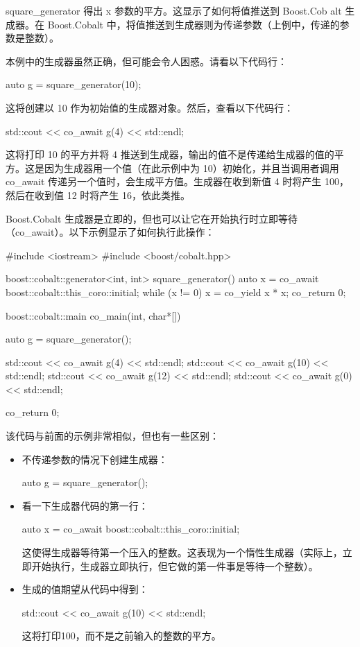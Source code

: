 square\_generator 得出 x 参数的平方。这显示了如何将值推送到 Boost.Cob alt 生成器。在 Boost.Cobalt 中，将值推送到生成器则为传递参数（上例中，传递的参数是整数）。

本例中的生成器虽然正确，但可能会令人困惑。请看以下代码行：

\begin{cpp}
auto g = square_generator(10);
\end{cpp}

这将创建以 10 作为初始值的生成器对象。然后，查看以下代码行：

\begin{cpp}
std::cout << co_await g(4) << std::endl;
\end{cpp}

这将打印 10 的平方并将 4 推送到生成器，输出的值不是传递给生成器的值的平方。这是因为生成器用一个值（在此示例中为 10）初始化，并且当调用者调用 co\_await 传递另一个值时，会生成平方值。生成器在收到新值 4 时将产生 100，然后在收到值 12 时将产生 16，依此类推。

Boost.Cobalt 生成器是立即的，但也可以让它在开始执行时立即等待（co\_await）。以下示例显示了如何执行此操作：

\begin{cpp}
#include <iostream>
#include <boost/cobalt.hpp>

boost::cobalt::generator<int, int> square_generator() {
    auto x = co_await boost::cobalt::this_coro::initial;
    while (x != 0) {
        x = co_yield x * x;
    }
    co_return 0;
}

boost::cobalt::main co_main(int, char*[]) {
    auto g = square_generator();

    std::cout << co_await g(4) << std::endl;
    std::cout << co_await g(10) << std::endl;
    std::cout << co_await g(12) << std::endl;
    std::cout << co_await g(0) << std::endl;

    co_return 0;
}
\end{cpp}

该代码与前面的示例非常相似，但也有一些区别：

\begin{itemize}
\item
不传递参数的情况下创建生成器：

\begin{cpp}
auto g = square_generator();
\end{cpp}

\item
看一下生成器代码的第一行：

\begin{cpp}
auto x = co_await boost::cobalt::this_coro::initial;
\end{cpp}

这使得生成器等待第一个压入的整数。这表现为一个惰性生成器（实际上，立即开始执行，生成器立即执行，但它做的第一件事是等待一个整数）。

\item
生成的值期望从代码中得到：

\begin{cpp}
std::cout << co_await g(10) << std::endl;
\end{cpp}

这将打印100，而不是之前输入的整数的平方。
\end{itemize}

